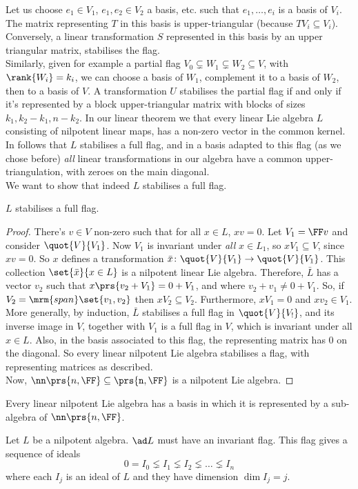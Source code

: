 \documentclass[10pt,a4paper,twoside,openany,hidelinks]{book}
\begin{document}
Let us choose $e_1 \in V_1$, $e_1,e_2 \in V_2$ a basis, etc. such that $e_1, \ldots, e_i$ is a basis of $V_i$. The matrix representing $T$ in this basis is upper-triangular (because $T V_i \subseteq V_i$).
Conversely, a linear transformation $S$ represented in this basis by an upper triangular matrix, stabilises the flag.\\
Similarly, given for example a partial flag $V_0 \subsetneq W_1 \subsetneq W_2 \subseteq V$, with $\rank{W_i} = k_i$, we can choose a basis of $W_1$, complement it to a basis of $W_2$, then to a basis of $V$. A transformation $U$ stabilises the partial flag if and only if it's represented by a block upper-triangular matrix with blocks of sizes $k_1, k_2-k_1, n-k_2$.
In our linear theorem we that every linear Lie algebra $L$ consisting of nilpotent linear maps, has a non-zero vector in the common kernel. In follows that $L$ stabilises a full flag, and in a basis adapted to this flag (as we chose before) \emph{all} linear transformations in our algebra have a common upper-triangulation, with zeroes on the main diagonal.\\
We want to show that indeed $L$ stabilises a full flag.

\begin{claim}
$L$ stabilises a full flag.
\end{claim}
\begin{proof}
There's $v \in V$ non-zero such that for all $x \in L$, $xv = 0$. Let $V_1 = \FF v$ and consider $\quot{V}{V_1}$. Now $V_1$ is invariant under \emph{all} $x \in L_1$, so $xV_1 \subseteq V$, since $xv = 0$. So $x$ defines a transformation $\bar{x} \colon \quot{V}{V_1} \to \quot{V}{V_1}$. This collection $\set{\bar{x}}{x \in L}$ is a nilpotent linear Lie algebra. Therefore, $\bar{L}$ has a vector $v_2$ such that $x\prs{v_2 + V_1} = 0 + V_1$, and where $v_2 + v_1 \neq 0 + V_1$. So, if $V_2 = \mrm{span}\set{v_1,v_2}$ then $xV_2 \subseteq V_2$. Furthermore, $xV_1 = 0$ and $xv_2 \in V_1$.\\
More generally, by induction, $\bar{L}$ stabilises a full flag in $\quot{V}{V_!}$, and its inverse image in $V$, together with $V_1$ is a full flag in $V$, which is invariant under all $x \in L$. Also, in the basis associated to this flag, the representing matrix has $0$ on the diagonal. So every linear nilpotent Lie algebra stabilises a flag, with representing matrices as described.\\
Now, $\nn\prs{n,\FF} \subseteq \tt\prs{n,\FF}$ is a nilpotent Lie algebra.
\end{proof}
\begin{conclusion}
Every linear nilpotent Lie algebra has a basis in which it is represented by a sub-algebra of $\nn\prs{n,\FF}$. 
\end{conclusion}
\begin{corollary}
Let $L$ be a nilpotent algebra. $\ad L$ must have an invariant flag. This flag gives a sequence of ideals
\[0 = I_0 \lneq I_1 \lneq I_2 \lneq \ldots \lneq I_n\]
where each $I_j$ is an ideal of $L$ and they have dimension $\dim I_j = j$.
\end{corollary}
\end{document}
